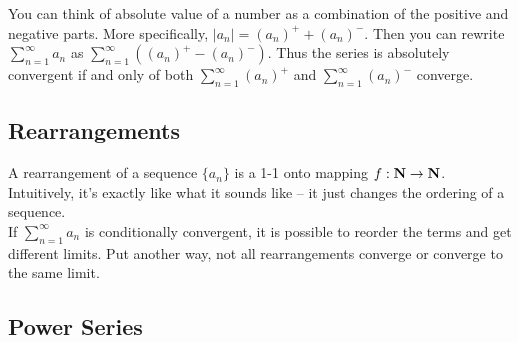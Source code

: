     You can think of absolute value of a number as a combination of the positive and negative 
    parts. More specifically, $|a_n| = (a_n)^+ + (a_n)^-$. Then you can rewrite 
    $\sum_{n=1}^{\infty} a_n$ as $\sum_{n=1}^{\infty} ((a_n)^+ - (a_n)^-)$. Thus the series
    is absolutely convergent if and only of both $\sum_{n=1}^{\infty} (a_n)^+$ and 
    $\sum_{n=1}^{\infty} (a_n)^-$ converge.\\
  \subsection{Rearrangements}
    A rearrangement of a sequence $\{a_n\}$ is a 1-1 onto mapping $f:\mathbf{N} \to \mathbf{N}$.
    Intuitively, it's exactly like what it sounds like -- it just changes the ordering of a 
    sequence.\\

    If $\sum_{n=1}^{\infty} a_n$ is conditionally convergent, it is possible to reorder the terms
    and get different limits. Put another way, not all rearrangements converge or converge to 
    the same limit.
  \subsection{Power Series}
